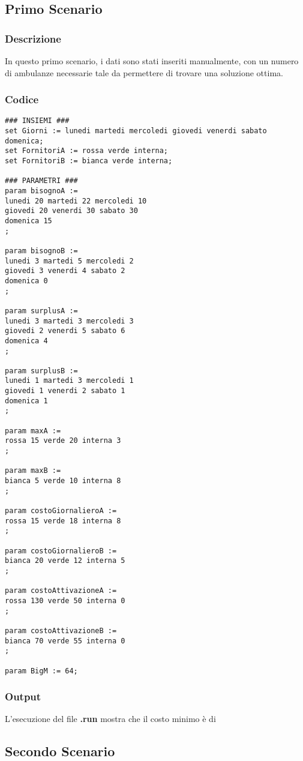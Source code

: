 \subsection{Primo Scenario}
\subsubsection{Descrizione}
In questo primo scenario, i dati sono stati inseriti manualmente, con un numero di ambulanze necessarie tale da permettere di trovare una soluzione ottima.
\subsubsection{Codice}
\begin{lstlisting}
### INSIEMI ###
set Giorni := lunedi martedi mercoledi giovedi venerdi sabato domenica;
set FornitoriA := rossa verde interna;
set FornitoriB := bianca verde interna;

### PARAMETRI ###
param bisognoA := 
lunedi 20 martedi 22 mercoledi 10 
giovedi 20 venerdi 30 sabato 30
domenica 15
;

param bisognoB := 
lunedi 3 martedi 5 mercoledi 2
giovedi 3 venerdi 4 sabato 2
domenica 0
;

param surplusA :=
lunedi 3 martedi 3 mercoledi 3
giovedi 2 venerdi 5 sabato 6
domenica 4
;

param surplusB :=
lunedi 1 martedi 3 mercoledi 1
giovedi 1 venerdi 2 sabato 1
domenica 1
;

param maxA :=
rossa 15 verde 20 interna 3
;

param maxB :=
bianca 5 verde 10 interna 8
;

param costoGiornalieroA :=
rossa 15 verde 18 interna 8
;

param costoGiornalieroB :=
bianca 20 verde 12 interna 5
;

param costoAttivazioneA :=
rossa 130 verde 50 interna 0
;

param costoAttivazioneB :=
bianca 70 verde 55 interna 0
; 

param BigM := 64;
\end{lstlisting}
\subsubsection{Output}
L'esecuzione del file \textbf{.run} mostra che il costo minimo è di 

\subsection{Secondo Scenario}
